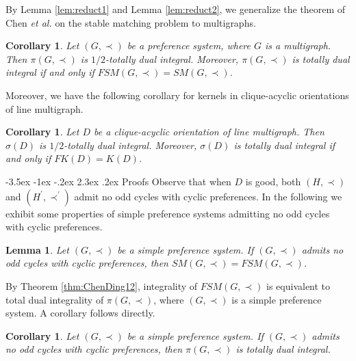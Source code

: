 \documentclass[11pt]{article}
\makeatletter
\newtheorem{lemma}[theorem]{Lemma}
\newtheorem{corollary}[theorem]{Corollary}
\numberwithin{theorem}{section}
\renewcommand\section{%
  \@startsection{section}{1}
                {\z@}%
                {-3.5ex \@plus -1ex \@minus -.2ex}%
                {2.3ex \@plus.2ex}%
                {\large\bfseries}%
}
\makeatother
\begin{document}
By Lemma \ref{lem:reduct1} and Lemma \ref{lem:reduct2}, we generalize the theorem of Chen \textit{et al.} \cite{ChenDing12} on the stable matching problem to multigraphs.
\begin{corollary}
  Let $(G,\prec)$ be a preference system, where $G$ is a multigraph.
  Then $\pi(G,\prec)$ is $1/2$-totally dual integral.
  Moreover, $\pi(G,\prec)$ is totally dual integral if and only if $FSM(G,\prec)=SM(G,\prec)$.
\end{corollary}

Moreover, we have the following corollary for kernels in clique-acyclic orientations of line multigraph.
\begin{corollary}
  Let $D$ be a clique-acyclic orientation of line multigraph.
  Then $\sigma(D)$ is $1/2$-totally dual integral.
  Moreover, $\sigma(D)$ is totally dual integral if and only if $FK(D)=K(D)$.
\end{corollary}

\section{Proofs}
Observe that when $D$ is good, both $(H,\prec)$ and $(H^\prime,\prec^\prime)$ admit no odd cycles with cyclic preferences.
In the following we exhibit some properties of simple preference systems admitting no odd cycles with cyclic preferences.
\begin{lemma}
\label{lem:prf1}
Let $(G,\prec)$ be a simple preference system. If $(G,\prec)$ admits no odd cycles with cyclic preferences, then $SM(G,\prec)=FSM(G,\prec)$.
\end{lemma}

By Theorem \ref{thm:ChenDing12}, integrality of $FSM(G,\prec)$ is equivalent to total dual integrality of $\pi(G,\prec)$, where $(G,\prec)$ is a simple preference system. A corollary follows directly.

\begin{corollary}
\label{cor:prf2}
Let $(G,\prec)$ be a simple preference system. If $(G,\prec)$ admits no odd cycles with cyclic preferences, then $\pi(G,\prec)$ is totally dual integral.
\end{corollary}
\end{document}
